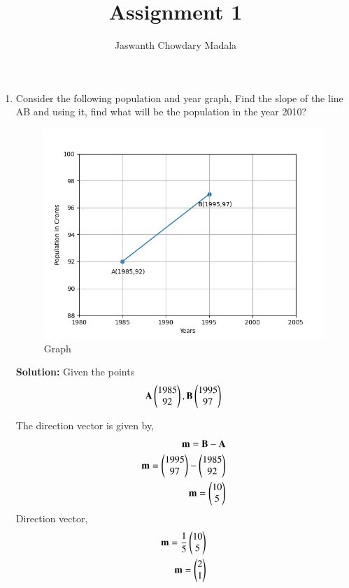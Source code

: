 \documentclass[journal,12pt,twocolumn]{IEEEtran}
\begin{document}
\vspace{3cm}


\title{Assignment 1}
\author{Jaswanth Chowdary Madala}





\maketitle

\newpage


\bigskip

\renewcommand{\thefigure}{\theenumi}
\renewcommand{\thetable}{\theenumi}


\begin{enumerate}
\item Consider the following population and year graph, Find the slope of the line AB and using it, find what will be the population in the year 2010?

\begin{figure}[ht]
\centering
\includegraphics[width = \columnwidth]{"./figs/fig.png"}
\caption{Graph}
\label{fig:1}
\end{figure}

\textbf{Solution:}
Given the points
\begin{align}
\mathbf{A} \begin{pmatrix}1985\\92\end{pmatrix},
\mathbf{B} \begin{pmatrix}1995 \\97\end{pmatrix}
\end{align}

The direction vector is given by, 
\begin{align}
\mathbf{m} = \mathbf{B} - \mathbf{A}\\
\mathbf{m} = \begin{pmatrix}1995 \\97\end{pmatrix} - \begin{pmatrix}1985\\92\end{pmatrix} \\
\mathbf{m} = \begin{pmatrix}10 \\ 5\end{pmatrix}
\end{align}
Direction vector,
\begin{align}
\mathbf{m} = \dfrac{1}{5} \begin{pmatrix}10 \\ 5\end{pmatrix} \\
\mathbf{m} = \begin{pmatrix}2 \\ 1\end{pmatrix}
\end{align}


\end{enumerate}
\end{document}
